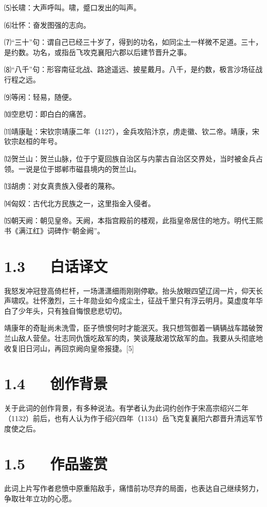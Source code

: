 \documentclass[letterpaper,10pt,english]{sphinxmanual}
\begin{document}
⑸长啸：大声呼叫。啸，蹙口发出的叫声。

⑹壮怀：奋发图强的志向。

⑺“三十”句：谓自己已经三十岁了，得到的功名，如同尘土一样微不足道。三十，是约数。功名，或指岳飞攻克襄阳六郡以后建节晋升之事。

⑻“八千”句：形容南征北战、路途遥远、披星戴月。八千，是约数，极言沙场征战行程之远。

⑼等闲：轻易，随便。

⑽空悲切：即白白的痛苦。

⑾靖康耻：宋钦宗靖康二年（1127），金兵攻陷汴京，虏走徽、钦二帝。靖康，宋钦宗赵桓的年号。

⑿贺兰山：贺兰山脉，位于宁夏回族自治区与内蒙古自治区交界处，当时被金兵占领。一说是位于邯郸市磁县境内的贺兰山。

⒀胡虏：对女真贵族入侵者的蔑称。

⒁匈奴：古代北方民族之一，这里指金入侵者。

⒂朝天阙：朝见皇帝。天阙，本指宫殿前的楼观，此指皇帝居住的地方。明代王熙书《满江红》词碑作“朝金阙”。


\section{1.3   白话译文}
\label{\detokenize{p01_u6563_u6587/_u5cb3_u98de-_u6ee1_u6c5f_u7ea2_xb7_u6012_u53d1_u51b2_u51a0:id5}}
我怒发冲冠登高倚栏杆，一场潇潇细雨刚刚停歇。抬头放眼四望辽阔一片，仰天长声啸叹。壮怀激烈，三十年勋业如今成尘土，征战千里只有浮云明月。莫虚度年华白了少年头，只有独自悔恨悲悲切切。

靖康年的奇耻尚未洗雪，臣子愤恨何时才能泯灭。我只想驾御着一辆辆战车踏破贺兰山敌人营垒。壮志同仇饿吃敌军的肉，笑谈蔑敌渴饮敌军的血。我要从头彻底地收复旧日河山，再回京阙向皇帝报捷。{[}5{]}


\section{1.4   创作背景}
\label{\detokenize{p01_u6563_u6587/_u5cb3_u98de-_u6ee1_u6c5f_u7ea2_xb7_u6012_u53d1_u51b2_u51a0:id6}}
关于此词的创作背景，有多种说法。有学者认为此词约创作于宋高宗绍兴二年（1132）前后，也有人认为作于绍兴四年（1134）岳飞克复襄阳六郡晋升清远军节度使之后。


\section{1.5   作品鉴赏}
\label{\detokenize{p01_u6563_u6587/_u5cb3_u98de-_u6ee1_u6c5f_u7ea2_xb7_u6012_u53d1_u51b2_u51a0:id7}}
此词上片写作者悲愤中原重陷敌手，痛惜前功尽弃的局面，也表达自己继续努力，争取壮年立功的心愿。
\end{document}
